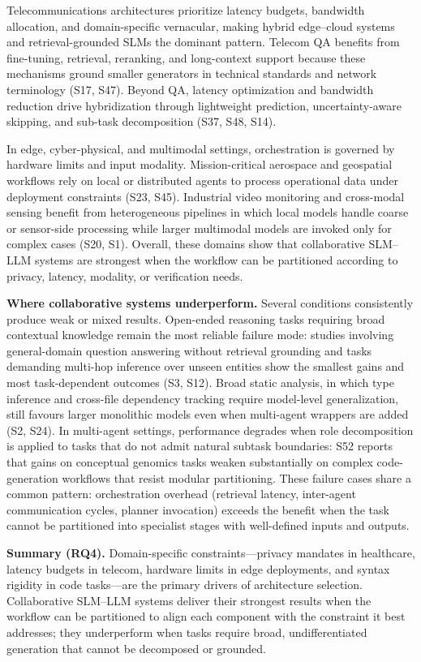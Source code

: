 Telecommunications architectures prioritize latency budgets, bandwidth allocation, and domain-specific vernacular, making hybrid edge--cloud systems and retrieval-grounded SLMs the dominant pattern. Telecom QA benefits from fine-tuning, retrieval, reranking, and long-context support because these mechanisms ground smaller generators in technical standards and network terminology (S17, S47). Beyond QA, latency optimization and bandwidth reduction drive hybridization through lightweight prediction, uncertainty-aware skipping, and sub-task decomposition (S37, S48, S14).

In edge, cyber-physical, and multimodal settings, orchestration is governed by hardware limits and input modality. Mission-critical aerospace and geospatial workflows rely on local or distributed agents to process operational data under deployment constraints (S23, S45). Industrial video monitoring and cross-modal sensing benefit from heterogeneous pipelines in which local models handle coarse or sensor-side processing while larger multimodal models are invoked only for complex cases (S20, S1). Overall, these domains show that collaborative SLM--LLM systems are strongest when the workflow can be partitioned according to privacy, latency, modality, or verification needs.

\noindent\textbf{Where collaborative systems underperform.} Several conditions consistently produce weak or mixed results. Open-ended reasoning tasks requiring broad contextual knowledge remain the most reliable failure mode: studies involving general-domain question answering without retrieval grounding and tasks demanding multi-hop inference over unseen entities show the smallest gains and most task-dependent outcomes (S3, S12). Broad static analysis, in which type inference and cross-file dependency tracking require model-level generalization, still favours larger monolithic models even when multi-agent wrappers are added (S2, S24). In multi-agent settings, performance degrades when role decomposition is applied to tasks that do not admit natural subtask boundaries: S52 reports that gains on conceptual genomics tasks weaken substantially on complex code-generation workflows that resist modular partitioning. These failure cases share a common pattern: orchestration overhead (retrieval latency, inter-agent communication cycles, planner invocation) exceeds the benefit when the task cannot be partitioned into specialist stages with well-defined inputs and outputs.

\noindent\textbf{Summary (RQ4).} Domain-specific constraints---privacy mandates in healthcare, latency budgets in telecom, hardware limits in edge deployments, and syntax rigidity in code tasks---are the primary drivers of architecture selection. Collaborative SLM--LLM systems deliver their strongest results when the workflow can be partitioned to align each component with the constraint it best addresses; they underperform when tasks require broad, undifferentiated generation that cannot be decomposed or grounded.

